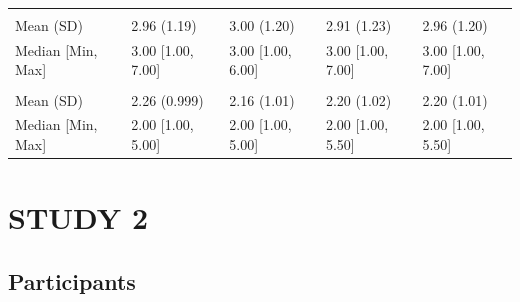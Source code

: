 \documentclass[
]{book}
\begin{document}
\begin{table}
\begin{tabular}[t]{lllll}
\addlinespace[0.3em]
\multicolumn{5}{l}{\textbf{antiwhite}}\\
\hspace{1em}Mean (SD) & 2.96 (1.19) & 3.00 (1.20) & 2.91 (1.23) & 2.96 (1.20)\\
\hspace{1em}Median [Min, Max] & 3.00 [1.00, 7.00] & 3.00 [1.00, 6.00] & 3.00 [1.00, 7.00] & 3.00 [1.00, 7.00]\\
\addlinespace[0.3em]
\multicolumn{5}{l}{\textbf{antiasian}}\\
\hspace{1em}Mean (SD) & 2.26 (0.999) & 2.16 (1.01) & 2.20 (1.02) & 2.20 (1.01)\\
\hspace{1em}Median [Min, Max] & 2.00 [1.00, 5.00] & 2.00 [1.00, 5.00] & 2.00 [1.00, 5.50] & 2.00 [1.00, 5.50]\\
\bottomrule
\end{tabular}
\end{table}

\hypertarget{study-2}{%
\chapter{STUDY 2}\label{study-2}}

\hypertarget{participants-1}{%
\section{Participants}\label{participants-1}}
\end{document}
